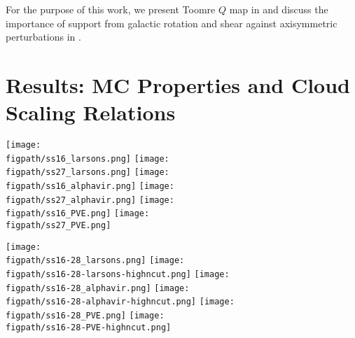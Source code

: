\IfFileExists{emulateapjlegacy.cls}{\documentclass[iop]{emulateapjlegacy}}{\documentclass[iop]{emulateapj}}
\newcommand{\AP}[1]{({\bf \color{apcolor} AP: #1})}
\def\figpath{./Fig}
\begin{document}
For the purpose of this work, we present Toomre $Q$ map in  and discuss the importance of support from galactic rotation and shear against axisymmetric perturbations in .

\section{Results: MC Properties and Cloud Scaling Relations}\label{sec:results}

\begin{figure*}
\centering
\texttt{[image: \\figpath/ss16\_larsons.png]}
\texttt{[image: \\figpath/ss27\_larsons.png]}
\texttt{[image: \\figpath/ss16\_alphavir.png]}
\texttt{[image: \\figpath/ss27\_alphavir.png]}
\texttt{[image: \\figpath/ss16\_PVE.png]}
\texttt{[image: \\figpath/ss27\_PVE.png]}
\caption{
Linewidth-size relation (top), 
{\bf .... (middle), and blah blah (bottom)}
for MCs (star symbols) 
identified in the two most extreme evolutionary stages of \flower\ --- accreting phase (left) and starburst phase (right).
Star symbols are color-coded by the density thresholds ($n_{\rm cut}$).
\AP{ have not found a good clipping for the upper left panel} 
\AP{please 1) increase a bit the size of the labels 2) put the legend only the right panels 
3) add a text label to the upper left corner, to ditinguish between accreting and starburst stage 
4) I would use a perceptually increasing colorbar to indicate the different cuts 
5) legend for the cuts can be substituted by a colorbar axis to be shown as an inset in 1 of the panels or as a separate figure below the panels}
\label{fig:alpha16-28}}
\end{figure*}

\begin{figure*}
\centering
\texttt{[image: \\figpath/ss16-28\_larsons.png]}
\texttt{[image: \\figpath/ss16-28-larsons-highncut.png]}
\texttt{[image: \\figpath/ss16-28\_alphavir.png]}
\texttt{[image: \\figpath/ss16-28-alphavir-highncut.png]}
\texttt{[image: \\figpath/ss16-28\_PVE.png]}
\texttt{[image: \\figpath/ss16-28-PVE-highncut.png]}
\caption{
\AP{evolutionary stage (function of sfr), different cuts (left/right)}\AP{similarly to the previous figure for different cuts; we might visually distinguish the points different color codes for the SFR and $n_{cut}$}
\label{fig:alpha16-28}}
\end{figure*}
\end{document}
